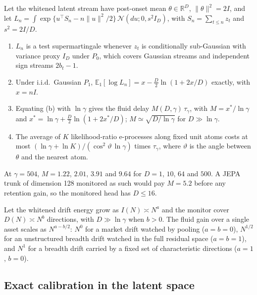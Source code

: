 \begin{proposition}\label{prop:tax}
Let the whitened latent stream have post-onset mean $\theta\in\mathbb{R}^D$, $\|\theta\|^2=2I$, and let $L_n=\int\exp\{u^{\top}S_n-n\|u\|^2/2\}\,\mathcal{N}(du;0,s^2I_D)$, with $S_n=\sum_{t\le n}z_t$ and $s^2=2I/D$.
\begin{enumerate}[label=(\alph*),leftmargin=*,itemsep=1pt,topsep=2pt]
\item $L_n$ is a test supermartingale whenever $z_t$ is conditionally sub-Gaussian with variance proxy $I_D$ under $P_0$, which covers Gaussian streams and independent sign streams $2b_t-1$.
\item Under i.i.d.\ Gaussian $P_1$, $\mathbb{E}_1[\log L_n]=x-\tfrac D2\ln(1+2x/D)$ exactly, with $x=nI$.
\item Equating (b) with $\ln\gamma$ gives the fluid delay $M(D,\gamma)\,\tau_\gamma$, with $M=x^\ast/\ln\gamma$ and $x^\ast=\ln\gamma+\tfrac D2\ln(1+2x^\ast/D)$; $M\simeq\sqrt{D/\ln\gamma}$ for $D\gg\ln\gamma$.
\item The average of $K$ likelihood-ratio e-processes along fixed unit atoms costs at most $(\ln\gamma+\ln K)/(\cos^2\vartheta\,\ln\gamma)$ times $\tau_\gamma$, where $\vartheta$ is the angle between $\theta$ and the nearest atom.
\end{enumerate}
\end{proposition}

At $\gamma=504$, $M=1.22$, $2.01$, $3.91$ and $9.64$ for $D=1$, $10$, $64$ and $500$. A JEPA trunk of dimension 128 monitored as such would pay $M=5.2$ before any retention gain, so the monitored head has $D\le16$.

\begin{corollary}\label{cor:scaling}
Let the whitened drift energy grow as $I(N)\asymp N^{a}$ and the monitor cover $D(N)\asymp N^{b}$ directions, with $D\gg\ln\gamma$ when $b>0$. The fluid gain over a single asset scales as $N^{a-b/2}$: $N^0$ for a market drift watched by pooling ($a=b=0$), $N^{1/2}$ for an unstructured breadth drift watched in the full residual space ($a=b=1$), and $N^{1}$ for a breadth drift carried by a fixed set of characteristic directions ($a=1$, $b=0$).
\end{corollary}

\subsection{Exact calibration in the latent space}\label{sec:calib}

